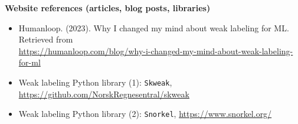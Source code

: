 \documentclass[11pt]{article}
\begin{document}
\textbf{Website references (articles, blog posts, libraries) }

\begin{itemize}
    \item Humanloop. (2023). Why I changed my mind about weak labeling for ML. Retrieved from\\ \url{https://humanloop.com/blog/why-i-changed-my-mind-about-weak-labeling-for-ml}
    
    \item Weak labeling Python library (1): \texttt{Skweak}, \url{https://github.com/NorskRegnesentral/skweak}
    \item Weak labeling Python library (2): \texttt{Snorkel}, \url{https://www.snorkel.org/}
\end{itemize}


































\end{document}
